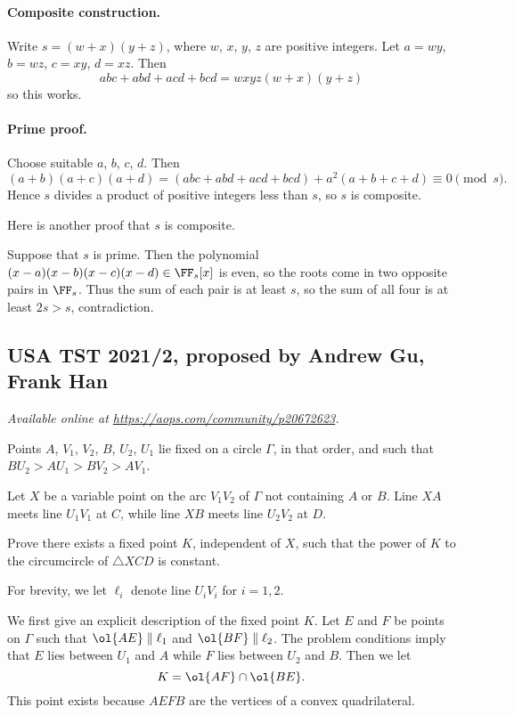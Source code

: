 \documentclass[11pt]{scrartcl}
\begin{document}
\paragraph{Composite construction.}
Write $s = (w+x)(y+z)$,
where $w$, $x$, $y$, $z$ are positive integers.
Let $a=wy$, $b=wz$, $c=xy$, $d=xz$.
Then
\[ abc+abd+acd+bcd = wxyz(w+x)(y+z) \]
so this works.

\paragraph{Prime proof.}
Choose suitable $a$, $b$, $c$, $d$. Then
\[
  (a+b)(a+c)(a+d)
  = (abc+abd+acd+bcd) + a^2(a+b+c+d)
  \equiv 0 \pmod s.
\]
Hence $s$ divides a product of positive integers less than $s$,
so $s$ is composite.

\begin{remark*}
  Here is another proof that $s$ is composite.

  Suppose that $s$ is prime.
  Then the polynomial $(x-a)(x-b)(x-c)(x-d) \in \FF_s[x]$
  is even, so the roots come in two opposite pairs in $\FF_s$.
  Thus the sum of each pair is at least $s$,
  so the sum of all four is at least $2s > s$, contradiction.
\end{remark*}
\pagebreak

\subsection{USA TST 2021/2, proposed by Andrew Gu, Frank Han}
\textsl{Available online at \url{https://aops.com/community/p20672623}.}
\begin{mdframed}[style=mdpurplebox,frametitle={Problem statement}]
Points $A$, $V_1$, $V_2$, $B$, $U_2$, $U_1$
lie fixed on a circle $\Gamma$, in that order,
and such that $BU_2 > AU_1 > BV_2 > AV_1$.

Let $X$ be a variable point on the arc $V_1 V_2$ of $\Gamma$
not containing $A$ or $B$.
Line $XA$ meets line $U_1 V_1$ at $C$,
while line $XB$ meets line $U_2 V_2$ at $D$.

Prove there exists a fixed point $K$, independent of $X$,
such that the power of $K$ to the circumcircle
of $\triangle XCD$ is constant.
\end{mdframed}
For brevity, we let $\ell_i$ denote line $U_iV_i$ for $i=1,2$.

We first give an explicit description of the fixed point $K$.
Let $E$ and $F$ be points on $\Gamma$ such that $\ol{AE} \parallel \ell_1$
and $\ol{BF} \parallel \ell_2$.
The problem conditions imply that $E$ lies between $U_1$ and $A$
while $F$ lies between $U_2$ and $B$.
Then we let \[ K = \ol{AF} \cap \ol{BE}. \]
This point exists because $AEFB$ are the vertices
of a convex quadrilateral.
\end{document}
